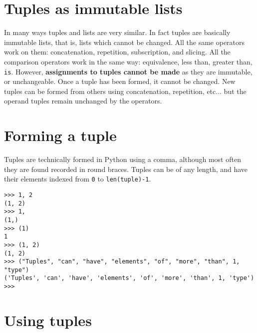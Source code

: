 \section{Tuples as immutable lists}

In many ways tuples and lists are very similar. In fact tuples are   basically immutable lists, that is, lists which cannot be changed. All   the same operators work on them: concatenation, repetition,   subscription, and slicing. All the comparison operators work in the   same way: equivalence, less than, greater than, \texttt{is}. However,   \textbf{assignments to tuples cannot be made} as they are   immutable, or unchangeable.  Once a tuple has been formed, it cannot be   changed. New tuples can be formed from others using concatenation,   repetition, etc... but the operand tuples remain unchanged by the   operators.

\section{Forming a tuple}

Tuples are technically formed in Python using a comma, although most   often they are found recorded in round braces. Tuples can be of any   length, and have their elements indexed from \texttt{0} to \texttt{len(tuple)-1}.
\begin{lstlisting}
>>> 1, 2
(1, 2)
>>> 1, 
(1,)
>>> (1)
1
>>> (1, 2)
(1, 2)
>>> ("Tuples", "can", "have", "elements", "of", "more", "than", 1, "type")
('Tuples', 'can', 'have', 'elements', 'of', 'more', 'than', 1, 'type')
>>>
\end{lstlisting}

\section{Using tuples}

